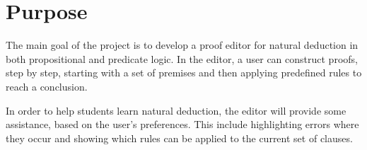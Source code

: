 \section{Purpose}
The main goal of the project is to develop a proof editor for natural deduction in both propositional and predicate logic. In the editor, a user can construct proofs, step by step, starting with a set of premises and then applying predefined rules to reach a conclusion.

In order to help students learn natural deduction, the editor will provide some assistance, based on the user's preferences. This include highlighting errors where they occur and showing which rules can be applied to the current set of clauses.

